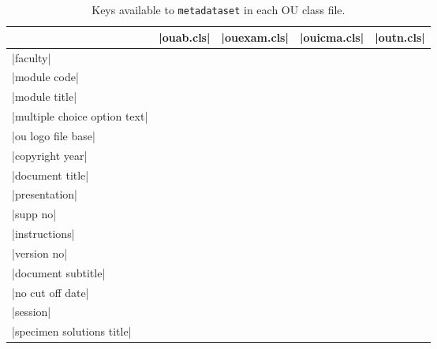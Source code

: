 \documentclass[a4paper]{ltxguide}
\newcommand\3{\unskip\enspace\fbox{\fontsize{4}{4}\selectfont NEW 3.0}}
\newcommand{\metakeyavailable}{\textbullet}
\begin{document}
\begin{longtable}{lcccc}
	\caption{Keys available to \texttt{metadataset} in each OU class file.}\label{tab:metadataset}\\
	\toprule
	                              & |ouab.cls|        & |ouexam.cls|      & |ouicma.cls|      & |outn.cls|        \\
	\midrule
	|faculty|                     & \metakeyavailable & \metakeyavailable & \metakeyavailable & \metakeyavailable \\
	|module code|                 & \metakeyavailable & \metakeyavailable & \metakeyavailable & \metakeyavailable \\
	|module title|                & \metakeyavailable & \metakeyavailable & \metakeyavailable & \metakeyavailable \\
	|multiple choice option text| & \metakeyavailable & \metakeyavailable & \metakeyavailable & \metakeyavailable \\
	|ou logo file base| & \metakeyavailable & \metakeyavailable & \metakeyavailable & \metakeyavailable \\
	|copyright year|             & \metakeyavailable & \metakeyavailable & \metakeyavailable  & \metakeyavailable \\
	\cmidrule{2-5}
	|document title|              & \metakeyavailable &                   & \metakeyavailable & \metakeyavailable \\
	|presentation|                & \metakeyavailable &                   & \metakeyavailable & \metakeyavailable \\
	|supp no|                     & \metakeyavailable & \metakeyavailable & \metakeyavailable &                   \\
	|instructions|                & \metakeyavailable & \metakeyavailable & \metakeyavailable &                   \\
	|version no|                  & \metakeyavailable & \metakeyavailable & \metakeyavailable &                   \\
	\cmidrule{2-5}
	|document subtitle|           & \metakeyavailable &                   & \metakeyavailable &                   \\
	|no cut off date|             & \metakeyavailable &                   &                   &                   \\
	|session|                     &                   & \metakeyavailable &                   &                   \\
	|specimen solutions title|    &                   & \metakeyavailable &                   &                   \\

\end{longtable}
\end{document}
